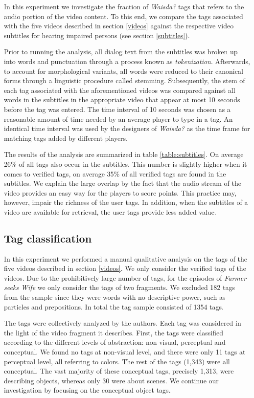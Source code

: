 In this experiment we investigate the fraction of \emph{Waisda?} tags that refers to
the audio portion of the video content. To this end, we compare the tags
associated with the five videos described in section \ref{videos} against the
respective video subtitles for hearing impaired persons (see section
\ref{subtitles}). 

Prior to running the analysis, all dialog text from the subtitles was broken
up into words and punctuation through a process known as
\textit{tokenization}. Afterwards, to account for morphological variants, all
words were reduced to their canonical forms through a linguistic procedure
called stemming. Subsequently, the stem of each tag associated with the
aforementioned videos was compared against all words in the subtitles in the
appropriate video that appear at most 10 seconds before the tag was entered.
The time interval of 10 seconds was chosen as a reasonable amount of time
needed by an average player to type in a tag. An identical time interval was
used by the designers of \emph{Waisda?} as the time frame for matching tags added by
different players.

The results of the analysis are summarized in table \ref{table:subtitles}. On
average 26\% of all tags also occur in the subtitles. This number is slightly
higher when it comes to verified tags, on average 35\% of all verified tags
are found in the subtitles. We explain the large overlap by the fact that the
audio stream of the video provides an easy way for the players to score
points. This practice may, however, impair the richness of the user tags. In
addition, when the subtitles of a video are available for retrieval, the user
tags provide less added value.

\subsection{Tag classification}

In this experiment we performed a manual qualitative analysis on the tags of
the five videos described in section \ref{videos}. We only consider the
verified tags of the videos. Due to the prohibitively large number of tags,
for the episodes of \emph{Farmer seeks Wife} we only consider the tags of two
fragments. We excluded 182 tags from the sample since they were words with no
descriptive power, such as particles and prepositions. In total the tag sample
consisted of 1354 tags.

The tags were collectively analyzed by the authors. Each tag was considered in
the light of the video fragment it describes. First, the tags were classified
according to the different levels of abstraction: non-visual, perceptual and
conceptual. We found no tags at non-visual level, and there were only 11 tags
at perceptual level, all referring to colors. The rest of the tags (1,343)
were all conceptual. The vast majority of these conceptual tags, precisely
1,313, were describing objects, whereas only 30 were about scenes. We continue
our investigation by focusing on the conceptual object tags.

